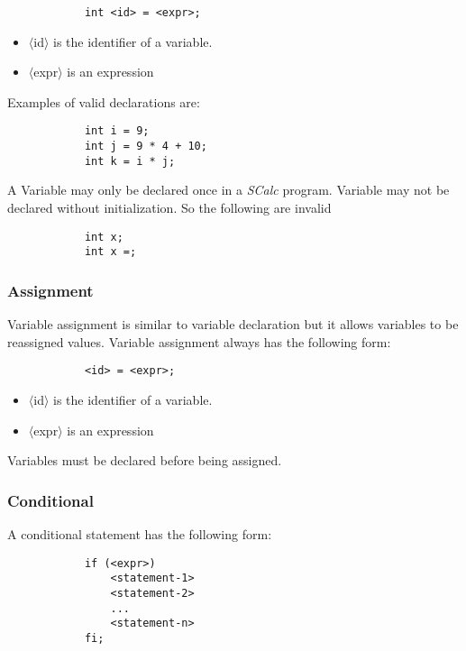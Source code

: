 \documentclass{article}
\begin{document}
		\begin{lstlisting}
			int <id> = <expr>;
		\end{lstlisting}

		\begin{itemize}
			\item{$\langle$id$\rangle$} is the identifier of a variable.
			\item{$\langle$expr$\rangle$} is an expression
		\end{itemize}
		
		Examples of valid declarations are:
		
		\begin{lstlisting}
			int i = 9;
			int j = 9 * 4 + 10;
			int k = i * j;
		\end{lstlisting}
		
		A Variable may only be declared once in a \textit{SCalc} program. Variable may not be declared without
		initialization. So the following are invalid
		
		\begin{lstlisting}
			int x;
			int x =;
		\end{lstlisting}
	
	
	\subsubsection{Assignment}

		Variable assignment is similar to variable declaration but it allows variables to be reassigned values. Variable
		assignment always has the following form:
		
		\begin{lstlisting}
			<id> = <expr>;
		\end{lstlisting}

		\begin{itemize}
			\item{$\langle$id$\rangle$} is the identifier of a variable.
			\item{$\langle$expr$\rangle$} is an expression
		\end{itemize}
		
		Variables must be declared before being assigned.
	
	
	\subsubsection{Conditional}

		A conditional statement has the following form:
		
		\begin{lstlisting}
			if (<expr>)
				<statement-1>
				<statement-2>
				...
				<statement-n>
			fi;
		\end{lstlisting}
\end{document}
